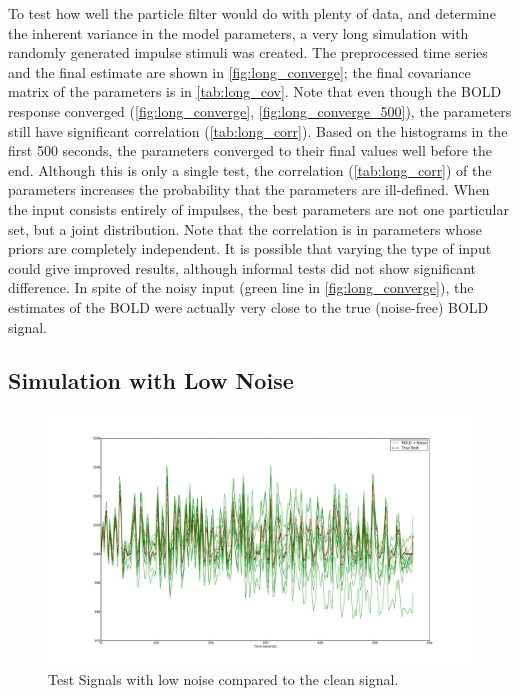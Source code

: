 To test how well the particle filter would do with plenty of data, and
determine the inherent variance in the model parameters, a very long simulation
with randomly generated impulse stimuli was created. The preprocessed time series
and the final estimate are shown in \autoref{fig:long_converge};
the final covariance matrix of the parameters is in \autoref{tab:long_cov}.
Note that even though the \ac{BOLD} response converged (\autoref{fig:long_converge},
\autoref{fig:long_converge_500}),
the parameters still have significant correlation (\autoref{tab:long_corr}).
Based on the histograms in the first 500 seconds, the parameters converged to
their final values well before the end.
Although this is only a single test, the correlation (\autoref{tab:long_corr})
of the parameters increases the probability that the parameters are
ill-defined. When the input
consists entirely of impulses, the best parameters are not one particular
set, but a joint distribution. Note that the correlation is in parameters whose priors
are completely independent. It is possible that varying the type of input could
give improved results, although informal tests did not show significant difference.
In spite of the noisy input (green line in \autoref{fig:long_converge}), the estimates
of the \ac{BOLD} were actually very close to the true (noise-free) \ac{BOLD} signal.

\subsection{Simulation with Low Noise}
\label{sec:SimLowNoise}
\begin{figure}
\centering
\includegraphics[clip=true,trim=6cm 2cm 5cm 3.5cm,width=15cm]{images/realization_lownoise}
\caption{Test Signals with low noise compared to the clean signal.}
\label{fig:LowNoiseRealization}
\end{figure}

